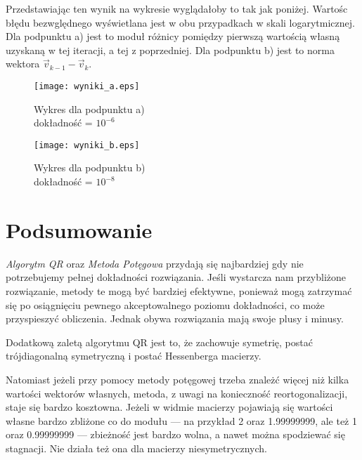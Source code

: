 \documentclass{article}
\begin{document}
  Przedstawiając ten wynik na wykresie wyglądałoby to tak jak poniżej. Wartośc błędu bezwględnego wyświetlana jest w obu przypadkach w skali logarytmicznej. Dla podpunktu a) jest to moduł różnicy pomiędzy pierwszą wartością własną uzyskaną w tej iteracji, a tej z poprzedniej. Dla podpunktu b) jest to norma wektora $\vec{v}_{k-1} - \vec{v}_k$. 
    \begin{figure}[!ht]
      \begin{minipage}{0.5\textwidth}
        \centering
        \texttt{[image: wyniki\_a.eps]}
        \caption{Wykres dla podpunktu a)\\dokładność = $10^{-6}$}
      \end{minipage}
      \begin{minipage}{0.5\textwidth}
        \centering
        \texttt{[image: wyniki\_b.eps]}
        \caption{Wykres dla podpunktu b)\\dokładność = $10^{-8}$}
      \end{minipage}
    \end{figure}


  \section{Podsumowanie}
  \textit{Algorytm QR} oraz \textit{Metoda Potęgowa} przydają się najbardziej gdy nie potrzebujemy pełnej dokładności rozwiązania. Jeśli wystarcza nam przybliżone rozwiązanie, metody te mogą być bardziej efektywne, ponieważ mogą zatrzymać się po osiągnięciu pewnego akceptowalnego poziomu dokładności, co może przyspieszyć obliczenia. Jednak obywa rozwiązania mają swoje plusy i minusy.

  Dodatkową zaletą algorytmu QR jest to, że zachowuje symetrię, postać trójdiagonalną
  symetryczną i postać Hessenberga macierzy.

  Natomiast jeżeli przy pomocy metody potęgowej trzeba znależć więcej niż kilka wartości wektorów własnych, metoda, z uwagi na konieczność reortogonalizacji, staje się bardzo kosztowna. Jeżeli w widmie macierzy pojawiają się wartości własne bardzo zbliżone co do modułu — na przykład 2 oraz 1.99999999, ale też 1 oraz 0.99999999 — zbieżność jest bardzo wolna, a nawet można spodziewać się stagnacji. Nie działa też ona dla macierzy niesymetrycznych.
\end{document}
